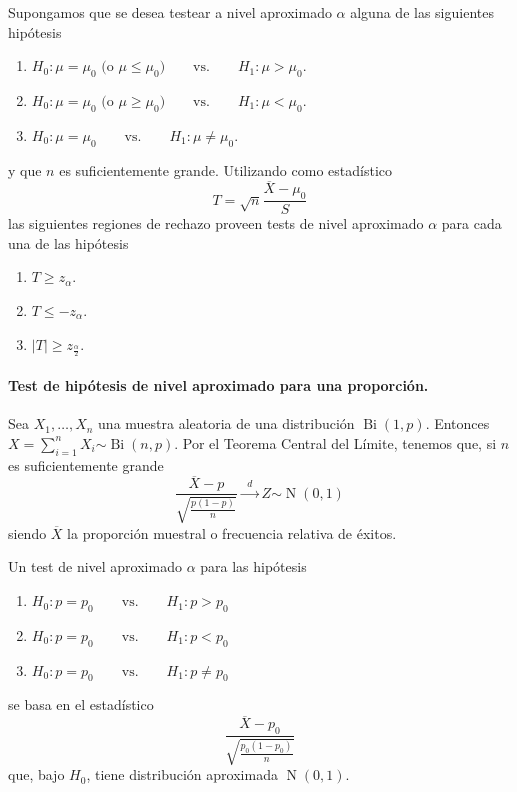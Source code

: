 \documentclass[11pt]{article}
\theoremstyle{plain}
\theoremstyle{definition}
\theoremstyle{remark}
\newcommand{\dists}[1]{\ensuremath{\operatorname{#1}}}  %
\newcommand{\dist}[1]{\ensuremath{\sim \operatorname{#1}}}  %
\newcommand{\tiende}[1]{\ensuremath{\xrightarrow{\;\; #1 \;\;}}}  %
\begin{document}
        Supongamos que se desea testear a nivel aproximado $\alpha$ alguna de las siguientes hipótesis
        \begin{enumerate}
          \item $ H_0 : \mu = \mu_0 \text{ (o $\mu \leq \mu_0$)} \qquad \text{vs.} \qquad H_1 : \mu > \mu_0 $.
          \item $ H_0 : \mu = \mu_0 \text{ (o $\mu \geq \mu_0$)} \qquad \text{vs.} \qquad H_1 : \mu < \mu_0 $.
          \item $ H_0 : \mu = \mu_0 \qquad \text{vs.} \qquad H_1 : \mu \neq \mu_0 $.
        \end{enumerate}
        y que $n$ es suficientemente grande. Utilizando como estadístico
        \[ T = \sqrt{n} \frac{\overline{X} - \mu_0}{S} \]
        las siguientes regiones de rechazo proveen tests de nivel aproximado $\alpha$ para cada una de las hipótesis
        \begin{enumerate}
          \item $T \geq z_\alpha$.
          \item $T \leq - z_\alpha$.
          \item $\vert T \vert \geq z_\frac{\alpha}{2}$.
        \end{enumerate}

        \paragraph{Test de hipótesis de nivel aproximado para una proporción.}

        Sea $X_1, \dots, X_n$ una muestra aleatoria de una distribución $\dists{Bi}(1,p)$. Entonces $X = \sum_{i=1}^n X_i \dist{Bi}(n,p)$.  Por el Teorema Central del Límite, tenemos que, si $n$ es suficientemente grande
        \[ \frac{\overline{X} - p}{\sqrt{\frac{p (1 - p)}{n}}} \tiende{d} Z \dist{N}(0,1) \]
        siendo $\overline{X}$ la proporción muestral o frecuencia relativa de éxitos.

        Un test de nivel aproximado $\alpha$ para las hipótesis
        \begin{enumerate}
          \item $ H_0 : p = p_0 \qquad \text{vs.} \qquad H_1 : p > p_0 $
          \item $ H_0 : p = p_0 \qquad \text{vs.} \qquad H_1 : p < p_0 $
          \item $ H_0 : p = p_0 \qquad \text{vs.} \qquad H_1 : p \neq p_0 $
        \end{enumerate}
        se basa en el estadístico
        \[ \frac{\overline{X} - p_0}{\sqrt{\frac{p_0 (1 - p_0)}{n}}} \]
        que, bajo $H_0$, tiene distribución aproximada $\dists{N}(0,1)$.
\end{document}
